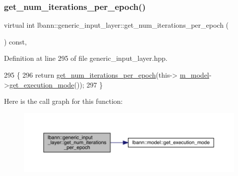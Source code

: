 \subsubsection{\texorpdfstring{get\+\_\+num\+\_\+iterations\+\_\+per\+\_\+epoch()}{get\_num\_iterations\_per\_epoch()}\hspace{0.1cm}{\footnotesize\ttfamily [2/2]}}
{\footnotesize\ttfamily virtual int lbann\+::generic\+\_\+input\+\_\+layer\+::get\+\_\+num\+\_\+iterations\+\_\+per\+\_\+epoch (\begin{DoxyParamCaption}{ }\end{DoxyParamCaption}) const\hspace{0.3cm}{\ttfamily [inline]}, {\ttfamily [virtual]}}



Definition at line 295 of file generic\+\_\+input\+\_\+layer.\+hpp.


\begin{DoxyCode}
295                                                    \{
296     \textcolor{keywordflow}{return} \hyperlink{classlbann_1_1generic__input__layer_a82bd22c834c5ef526e0c740c80451e1b}{get\_num\_iterations\_per\_epoch}(this->
      \hyperlink{classlbann_1_1Layer_a3d9315e99574166f2f33e37b572021d2}{m\_model}->\hyperlink{classlbann_1_1model_addb40597cf29aa6d31b6a7d09ef48608}{get\_execution\_mode}());
297   \}
\end{DoxyCode}
Here is the call graph for this function\+:\nopagebreak
\begin{figure}[H]
\begin{center}
\leavevmode
\includegraphics[width=350pt]{classlbann_1_1generic__input__layer_a82bd22c834c5ef526e0c740c80451e1b_cgraph}
\end{center}
\end{figure}
\mbox{\label{classlbann_1_1generic__input__layer_a8a85d3e1bdd31082ca22535939596acb}} 

